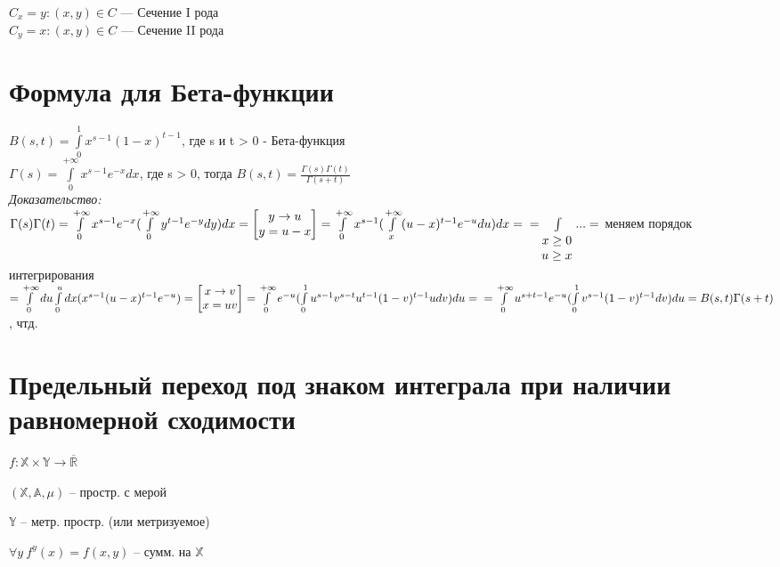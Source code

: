 \documentclass[paper=a4, fontsize=14pt]{report}
\begin{document}
$C_x = {y : (x, y) \in C}$ --- Сечение I рода\\
$C_y = {x : (x, y) \in C}$ --- Сечение II рода\\

\section{Формула для Бета-функции}
$B(s, t) = \int\limits_{0}^{1}x^{s-1}(1-x)^{t-1}$, где s и t > 0 - Бета-функция \\
$\Gamma(s) = \int\limits_{0}^{+\infty}x^{s-1}e^{-x}dx$, где s > 0, тогда $B(s, t) = \frac{\Gamma(s)\Gamma(t)}{\Gamma(s+t)}$ \\


\emph{Доказательство:}\\
$\Gamma(s)\Gamma(t) = \int\limits_{0}^{+\infty}x^{s-1}e^{-x}(\int\limits_{0}^{+\infty}y^{t-1}e^{-y}dy)dx =
\begin{bmatrix}y \rightarrow u \\ y = u - x \end{bmatrix} =
\int\limits_{0}^{+\infty}x^{s-1}(\int\limits_{x}^{+\infty}(u-x)^{t-1}e^{-u}du)dx=\\
= \int\limits_{\begin{matrix}x \geq 0 \\ u \geq x \end{matrix}}...=$ меняем порядок интегрирования\\
$= \int\limits_{0}^{+\infty}du\int\limits_{0}^{u}dx (x^{s-1}(u-x)^{t-1}e^{-u})
= \begin{bmatrix} x \rightarrow v\\ x = uv \end{bmatrix}
= \int\limits_{0}^{+\infty}e^{-u}(\int\limits_{0}^{1}u^{s-1}v^{s-t}u^{t-1}(1-v)^{t-1}udv)du =\\
= \int\limits_{0}^{+\infty}u^{s+t-1}e^{-u}(\int\limits_{0}^{1}v^{s-1}(1-v)^{t-1}dv)du = B(s,t)\Gamma(s+t)$, чтд.


\section{Предельный переход под знаком интеграла при наличии равномерной сходимости}
$ f : \mathbb{X} \times \mathbb{Y} \rightarrow \overline{\mathbb{R}}$

$ (\mathbb{X}, \mathbb{A}, \mu) $ -- простр. с мерой

$ \mathbb{Y} $ -- метр. простр. (или метризуемое)

$ \forall y ~ f^y(x) = f(x, y) $ -- сумм. на $ \mathbb{X} $
\end{document}
